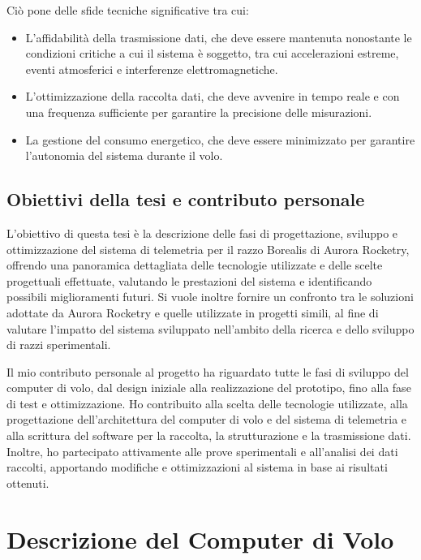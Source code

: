 \documentclass[12pt,a4paper,twoside]{book}
\begin{document}
Ciò pone delle sfide tecniche significative tra cui:
\begin{itemize}
    \item L'affidabilità della trasmissione dati, che deve essere mantenuta
          nonostante le condizioni critiche a cui il sistema è soggetto, tra cui
          accelerazioni estreme, eventi atmosferici e interferenze elettromagnetiche.
    \item L'ottimizzazione della raccolta dati, che deve avvenire in tempo reale
          e con una frequenza sufficiente per garantire la precisione delle misurazioni.
    \item La gestione del consumo energetico, che deve essere minimizzato per
          garantire l'autonomia del sistema durante il volo.
\end{itemize}

\section{Obiettivi della tesi e contributo personale}
L'obiettivo di questa tesi è la descrizione delle fasi di progettazione,
sviluppo e ottimizzazione del sistema di telemetria per il razzo Borealis di
Aurora Rocketry, offrendo una panoramica dettagliata delle tecnologie utilizzate
e delle scelte progettuali effettuate, valutando le prestazioni del sistema e
identificando possibili miglioramenti futuri.
Si vuole inoltre fornire un confronto tra le soluzioni adottate da Aurora
Rocketry e quelle utilizzate in progetti simili, al fine di valutare l'impatto
del sistema sviluppato nell'ambito della ricerca e dello sviluppo di razzi
sperimentali.

Il mio contributo personale al progetto ha riguardato tutte le fasi di sviluppo
del computer di volo, dal design iniziale alla realizzazione del prototipo, fino
alla fase di test e ottimizzazione.
Ho contribuito alla scelta delle tecnologie utilizzate, alla progettazione
dell'architettura del computer di volo e del sistema di telemetria e alla
scrittura del software per la raccolta, la strutturazione e la trasmissione dati.
Inoltre, ho partecipato attivamente alle prove sperimentali e all'analisi dei
dati raccolti, apportando modifiche e ottimizzazioni al sistema in base ai
risultati ottenuti.

\chapter{Descrizione del Computer di Volo} \label{chap:flight-computer}
\pagestyle{plain}
\end{document}
